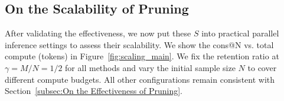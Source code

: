 \documentclass[11pt]{article}
\theoremstyle{plain}
\begin{document}




\subsection{On the Scalability of Pruning}
\label{sec:Scaling}

After validating the effectiveness, we now put these $S$ into practical parallel inference settings to assess their scalability.
We show the cons@N vs. total compute (tokens) in Figure~\ref{fig:scaling_main}.
We fix the retention ratio at $\gamma = M/N = 1/2$ for all methods and vary the initial sample size $N$ to cover different compute budgets.
All other configurations remain consistent with Section~\ref{subsec:On the Effectiveness of Pruning}.
\end{document}
